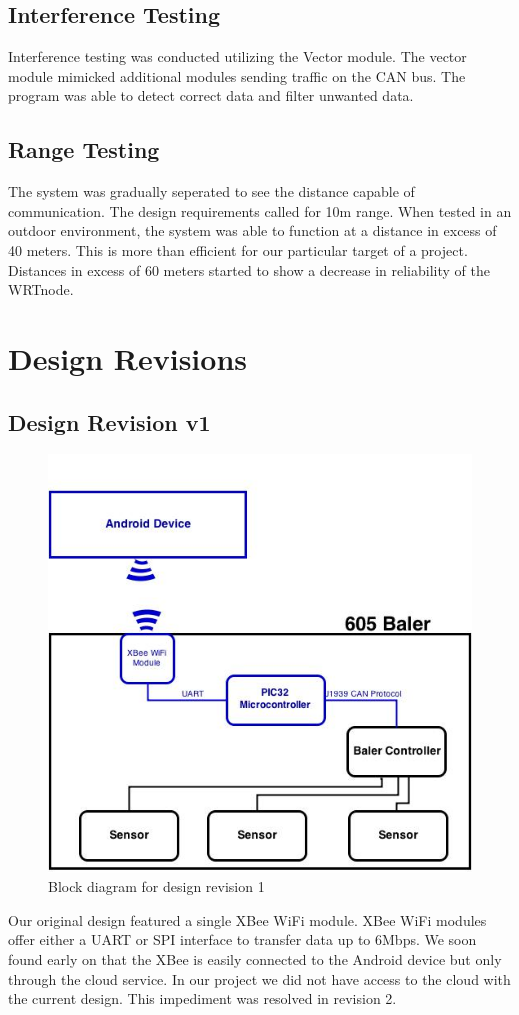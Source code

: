 \documentclass[paper=a4, fontsize=11pt]{scrartcl}
\numberwithin{equation}{section}		%
\numberwithin{figure}{section}			%
\numberwithin{table}{section}				%
\begin{document}
\subsection{Interference Testing}
Interference testing was conducted utilizing the Vector module. The vector module mimicked additional modules sending traffic on the CAN bus. The program was able to detect correct data and filter unwanted data. \\

\subsection{Range Testing}
The system was gradually seperated to see the distance capable of communication. The design requirements called for 10m range. When tested in an outdoor environment, the system was able to function at a distance in excess of 40 meters. This is more than efficient for our particular target of a project. Distances in excess of 60 meters started to show a decrease in reliability of the WRTnode.


\pagebreak
\section{Design Revisions}
\subsection{Design Revision v1} 
 \begin{figure}[H]
	 \center\includegraphics[scale=0.4]{rev1.jpg}
 \caption{Block diagram for design revision 1}
 \end{figure}
Our original design featured a single XBee WiFi module. XBee WiFi modules offer either a UART or SPI interface to transfer data up to 6Mbps. We soon found early on that the XBee is easily connected to the Android device but only through the cloud service. In our project we did not have access to the cloud with the current design. This impediment was resolved in revision 2.\\
\end{document}
